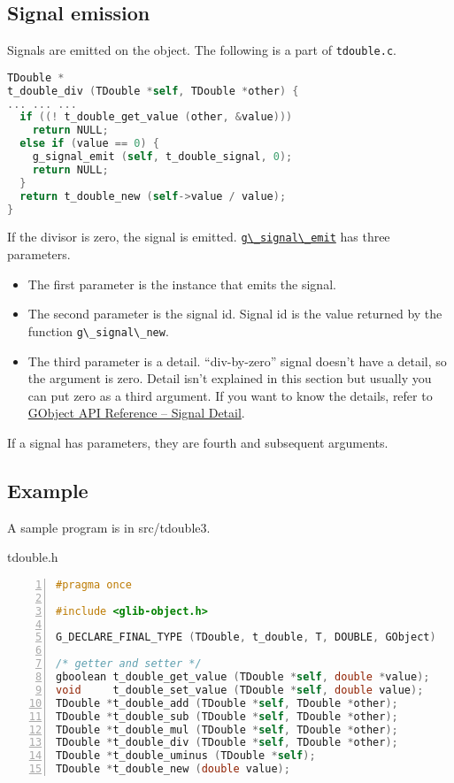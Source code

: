 \subsection{Signal emission}\label{signal-emission}

Signals are emitted on the object. The following is a part of
\passthrough{\lstinline!tdouble.c!}.

\begin{lstlisting}[language=C]
TDouble *
t_double_div (TDouble *self, TDouble *other) {
... ... ...
  if ((! t_double_get_value (other, &value)))
    return NULL;
  else if (value == 0) {
    g_signal_emit (self, t_double_signal, 0);
    return NULL;
  }
  return t_double_new (self->value / value);
}
\end{lstlisting}

If the divisor is zero, the signal is emitted.
\href{https://docs.gtk.org/gobject/func.signal_emit.html}{\passthrough{\lstinline!g\_signal\_emit!}}
has three parameters.

\begin{itemize}
\tightlist
\item
  The first parameter is the instance that emits the signal.
\item
  The second parameter is the signal id. Signal id is the value returned
  by the function \passthrough{\lstinline!g\_signal\_new!}.
\item
  The third parameter is a detail. ``div-by-zero'' signal doesn't have a
  detail, so the argument is zero. Detail isn't explained in this
  section but usually you can put zero as a third argument. If you want
  to know the details, refer to
  \href{https://docs.gtk.org/gobject/concepts.html\#the-detail-argument}{GObject
  API Reference -- Signal Detail}.
\end{itemize}

If a signal has parameters, they are fourth and subsequent arguments.

\subsection{Example}\label{example}

A sample program is in src/tdouble3.

tdouble.h

\begin{lstlisting}[language=C, numbers=left]
#pragma once

#include <glib-object.h>

G_DECLARE_FINAL_TYPE (TDouble, t_double, T, DOUBLE, GObject)

/* getter and setter */
gboolean t_double_get_value (TDouble *self, double *value);
void     t_double_set_value (TDouble *self, double value);
TDouble *t_double_add (TDouble *self, TDouble *other);
TDouble *t_double_sub (TDouble *self, TDouble *other);
TDouble *t_double_mul (TDouble *self, TDouble *other);
TDouble *t_double_div (TDouble *self, TDouble *other);
TDouble *t_double_uminus (TDouble *self);
TDouble *t_double_new (double value);
\end{lstlisting}

